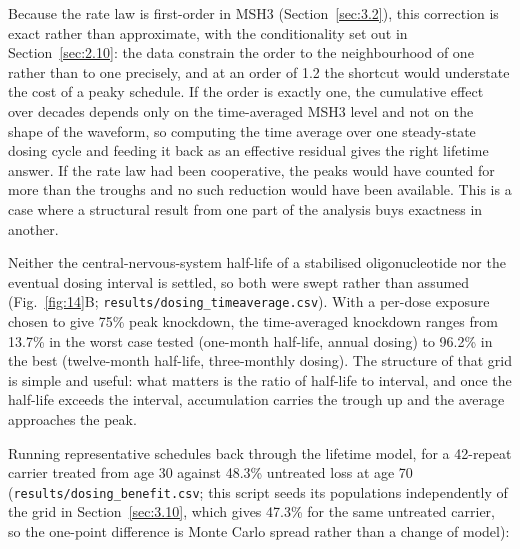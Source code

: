 \documentclass[conference]{IEEEtran}
\begin{document}
Because the rate law is first-order in MSH3 (Section~\ref{sec:3.2}), this correction is exact rather than approximate, with the conditionality set out in Section~\ref{sec:2.10}: the data constrain the order to the neighbourhood of one rather than to one precisely, and at an order of 1.2 the shortcut would understate the cost of a peaky schedule. If the order is exactly one, the cumulative effect over decades depends only on the time-averaged MSH3 level and not on the shape of the waveform, so computing the time average over one steady-state dosing cycle and feeding it back as an effective residual gives the right lifetime answer. If the rate law had been cooperative, the peaks would have counted for more than the troughs and no such reduction would have been available. This is a case where a structural result from one part of the analysis buys exactness in another.

Neither the central-nervous-system half-life of a stabilised oligonucleotide nor the eventual dosing interval is settled, so both were swept rather than assumed (Fig.~\ref{fig:14}B; \texttt{results/\allowbreak{}dosing\_\allowbreak{}timeaverage.\allowbreak{}csv}). With a per-dose exposure chosen to give 75\% peak knockdown, the time-averaged knockdown ranges from 13.7\% in the worst case tested (one-month half-life, annual dosing) to 96.2\% in the best (twelve-month half-life, three-monthly dosing). The structure of that grid is simple and useful: what matters is the ratio of half-life to interval, and once the half-life exceeds the interval, accumulation carries the trough up and the average approaches the peak.

Running representative schedules back through the lifetime model, for a 42-repeat carrier treated from age 30 against 48.3\% untreated loss at age 70 (\texttt{results/\allowbreak{}dosing\_\allowbreak{}benefit.\allowbreak{}csv}; this script seeds its populations independently of the grid in Section~\ref{sec:3.10}, which gives 47.3\% for the same untreated carrier, so the one-point difference is Monte Carlo spread rather than a change of model):
\end{document}
